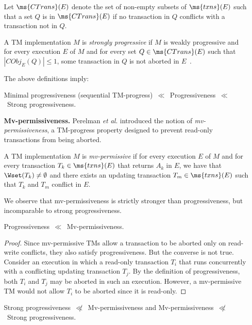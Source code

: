 Let $\ms{CTrans}(E)$ denote the set of non-empty subsets of $\ms{txns}(E)$ such that a set $Q$ is in $\ms{CTrans}(E)$ 
if no transaction in $Q$ conflicts with a transaction not in $Q$.
\begin{definition}
\label{def:sprog}
A TM implementation $M$ is \emph{strongly progressive} if $M$ is weakly progressive 
and for every execution $E$ of $M$ and for every set $Q \in \ms{CTrans}(E)$ such that $|CObj_{E}(Q)| \leq 1$, 
some transaction in $Q$ is not aborted in $E$~\cite{tm-book}.
\end{definition}
The above definitions imply:
\begin{corollary}
Minimal progressiveness (sequential TM-progress)~$\ll$~Progressiveness~$\ll$~Strong progressiveness.
\end{corollary}
\vspace{1mm}\noindent\textbf{Mv-permissiveness.}
Perelman \emph{et al.} introduced the notion of \emph{mv-permissiveness}, a TM-progress property
designed to prevent read-only transactions from being aborted.
\begin{definition}[Mv-permissiveness]
\label{def:sprog}
A TM implementation $M$ is \emph{mv-permissive} if for every execution $E$ of $M$ and
for every transaction $T_k\in \ms{txns}(E)$ that returns $A_k$ in $E$, we have that $\Wset(T_k)\neq \emptyset$
and there exists an updating transaction $T_m\in \ms{txns}(E)$ such that $T_k$ and $T_m$ conflict in $E$.
\end{definition}
We observe that mv-permissiveness is strictly stronger than progressiveness, but incomparable to strong progressiveness.
\begin{observation}
Progressiveness~$\ll$~Mv-permissiveness.
\end{observation}
\begin{proof}
Since mv-permissive TMs allow a transaction to be aborted only on read-write conflicts, they also
satisfy progressiveness. But the converse is not true.
Consider an execution in which a read-only transaction $T_i$ that runs concurrently with a conflicting
updating transaction $T_j$.
By the definition of progressiveness, both $T_i$ and $T_j$ may be aborted in such an execution.
However, a mv-permissive TM would not allow $T_i$ to be aborted since it is read-only.
\end{proof}
\begin{observation}
Strong progressiveness~$\not\ll$~Mv-permissiveness and Mv-permissiveness~$\not\ll$~Strong progressiveness.
\end{observation}
